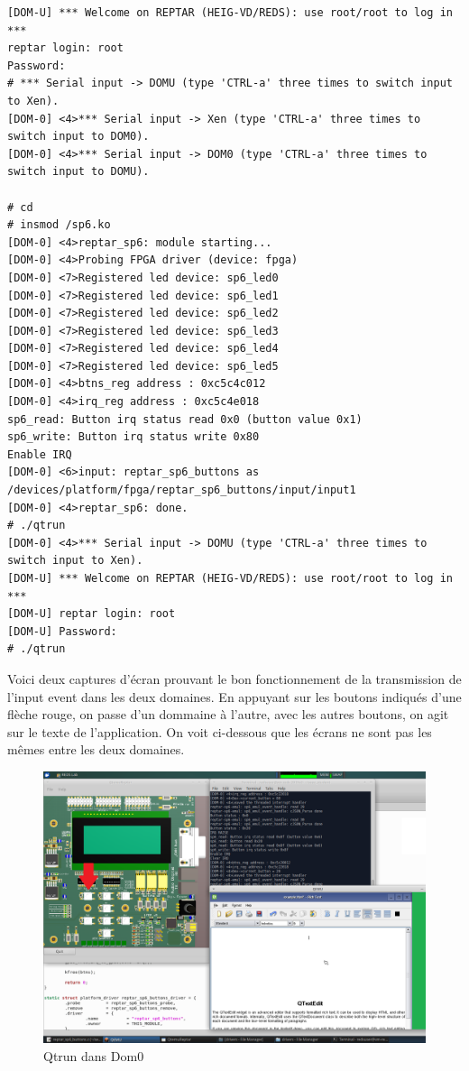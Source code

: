 \begin{lstlisting}
[DOM-U] *** Welcome on REPTAR (HEIG-VD/REDS): use root/root to log in ***
reptar login: root
Password: 
# *** Serial input -> DOMU (type 'CTRL-a' three times to switch input to Xen).
[DOM-0] <4>*** Serial input -> Xen (type 'CTRL-a' three times to switch input to DOM0).
[DOM-0] <4>*** Serial input -> DOM0 (type 'CTRL-a' three times to switch input to DOMU).

# cd
# insmod /sp6.ko 
[DOM-0] <4>reptar_sp6: module starting...
[DOM-0] <4>Probing FPGA driver (device: fpga)
[DOM-0] <7>Registered led device: sp6_led0
[DOM-0] <7>Registered led device: sp6_led1
[DOM-0] <7>Registered led device: sp6_led2
[DOM-0] <7>Registered led device: sp6_led3
[DOM-0] <7>Registered led device: sp6_led4
[DOM-0] <7>Registered led device: sp6_led5
[DOM-0] <4>btns_reg address : 0xc5c4c012
[DOM-0] <4>irq_reg address : 0xc5c4e018
sp6_read: Button irq status read 0x0 (button value 0x1)
sp6_write: Button irq status write 0x80
Enable IRQ
[DOM-0] <6>input: reptar_sp6_buttons as /devices/platform/fpga/reptar_sp6_buttons/input/input1
[DOM-0] <4>reptar_sp6: done.
# ./qtrun
[DOM-0] <4>*** Serial input -> DOMU (type 'CTRL-a' three times to switch input to Xen).
[DOM-U] *** Welcome on REPTAR (HEIG-VD/REDS): use root/root to log in ***
[DOM-U] reptar login: root 
[DOM-U] Password: 
# ./qtrun 
\end{lstlisting}
Voici deux captures d'écran prouvant le bon fonctionnement de la transmission de l'input event dans les deux domaines. En appuyant sur les boutons indiqués d'une flèche rouge, on passe d'un dommaine à l'autre, avec les autres boutons, on agit sur le texte de l'application. On voit ci-dessous que les écrans ne sont pas les mêmes entre les deux domaines.
\begin{figure}[H]
	\begin{center}
		\includegraphics[width=16cm]{img/dom02.png}
		\caption{Qtrun dans Dom0}
		\label{qtrun2}
	\end{center}
\end{figure}
